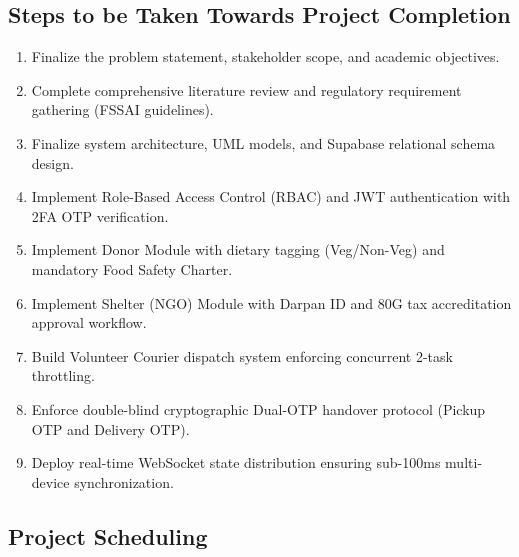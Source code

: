 \documentclass[12pt,a4paper]{article}
\begin{document}
\subsection{Steps to be Taken Towards Project Completion}
\begin{enumerate}
    \item Finalize the problem statement, stakeholder scope, and academic objectives.
    \item Complete comprehensive literature review and regulatory requirement gathering (FSSAI guidelines).
    \item Finalize system architecture, UML models, and Supabase relational schema design.
    \item Implement Role-Based Access Control (RBAC) and JWT authentication with 2FA OTP verification.
    \item Implement Donor Module with dietary tagging (Veg/Non-Veg) and mandatory Food Safety Charter.
    \item Implement Shelter (NGO) Module with Darpan ID and 80G tax accreditation approval workflow.
    \item Build Volunteer Courier dispatch system enforcing concurrent 2-task throttling.
    \item Enforce double-blind cryptographic Dual-OTP handover protocol (Pickup OTP and Delivery OTP).
    \item Deploy real-time WebSocket state distribution ensuring sub-100ms multi-device synchronization.
\end{enumerate}

\subsection{Project Scheduling}
\end{document}
